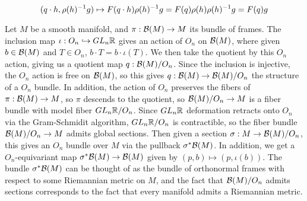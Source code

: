 \[
(q \cdot h, \rho(h)^{-1} g) \mapsto F(q \cdot h)\rho(h)^{-1} g = F(q)\rho(h)\rho(h)^{-1} g
= F(q)g
\]
%
\begin{exmp}
Let $M$ be a smooth manifold, and $\pi : \mathcal{B}(M) \to M$ its bundle of frames.
The inclusion map $\iota: O_n \hookrightarrow GL_n\mathbb{R}$ gives an action of $O_n$ on
$\mathcal{B}(M)$, where given $b \in \mathcal{B}(M)$ and $T \in O_n$, $b \cdot T = b \cdot \iota(T)$.
We then take the quotient by this $O_n$ action, giving us a quotient map
$q : \mathcal{B}(M) / O_n$. Since the inclusion is injective, the $O_n$ action
is free on $\mathcal{B}(M)$, so this gives $q : \mathcal{B}(M) \to \mathcal{B}(M) / O_n$ the structure of a
$O_n$ bundle. In addition, the action of $O_n$ preserves the fibers of
$\pi : \mathcal{B}(M) \to M$, so $\pi$ descends to the quotient, so $\mathcal{B}(M) / O_n \to M$
is a fiber bundle with model fiber $GL_n\mathbb{R} / O_n$. Since $GL_n\mathbb{R}$ deformation
retracts onto $O_n$ via the Gram-Schmidit algorithm, $GL_n\mathbb{R} / O_n$ is
contractible, so the fiber bundle $\mathcal{B}(M)/ O_n \to M$ admits global sections.
Then given a section $\sigma : M \to \mathcal{B}(M) / O_n$, this gives an $O_n$ bundle
over $M$ via the pullback $\sigma^*\mathcal{B}(M)$. In addition, we get a $O_n$-equivariant
map $\sigma^*\mathcal{B}(M) \to \mathcal{B}(M)$ given by $(p, b) \mapsto (p, \iota(b))$. The
bundle $\sigma^*\mathcal{B}(M)$ can be thought of as the bundle of orthonormal frames
with respect to some Riemannian metric on $M$, and the fact that $\mathcal{B}(M) / O_n$
admits sections corresponds to the fact that every manifold admits a Riemannian
metric.
\end{exmp}
%
